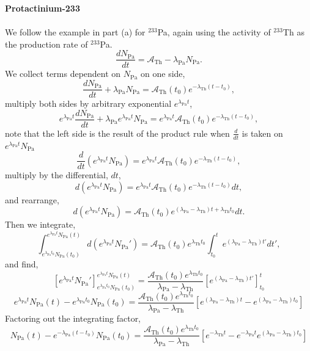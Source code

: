 \documentclass{report}
\begin{document}
\textbf{Protactinium-233}\\
\-\\
We follow the example in part (a) for $^{233}$Pa, again using the activity of $^{233}$Th as the production rate of $^{233}$Pa.
$$ \frac{dN_{\text{Pa}}}{dt} = \mathcal{A}_{\text{Th}} - \lambda_{\text{Pa}}N_{\text{Pa}}. $$
We collect terms dependent on $N_{\text{Pa}}$ on one side,
$$ \frac{dN_{\text{Pa}}}{dt} + \lambda_{\text{Pa}}N_{\text{Pa}} = \mathcal{A}_{\text{Th}}(t_0) e^{-\lambda_{\text{Th}}(t-t_0)}, $$
multiply both sides by arbitrary exponential $e^{\lambda_{\text{Pa}}t}$,
$$ e^{\lambda_{\text{Pa}}t}\frac{dN_{\text{Pa}}}{dt} + \lambda_{\text{Pa}}e^{\lambda_{\text{Pa}}t}N_{\text{Pa}} = e^{\lambda_{\text{Pa}}t}\mathcal{A}_{\text{Th}}(t_0) e^{-\lambda_{\text{Th}}(t-t_0)}, $$
note that the left side is the result of the product rule when $\frac{d}{dt}$ is taken on $e^{\lambda_{\text{Pa}}t}N_{\text{Pa}}$
$$ \frac{d}{dt} (e^{\lambda_{\text{Pa}}t}N_{\text{Pa}}) = e^{\lambda_{\text{Pa}}t}\mathcal{A}_{\text{Th}}(t_0) e^{-\lambda_{\text{Th}}(t-t_0)}, $$
multiply by the differential, $dt$,
$$ d(e^{\lambda_{\text{Pa}}t}N_{\text{Pa}}) = e^{\lambda_{\text{Pa}}t}\mathcal{A}_{\text{Th}}(t_0) e^{-\lambda_{\text{Th}}(t-t_0)} dt ,$$
and rearrange,
$$ d(e^{\lambda_{\text{Pa}}t}N_{\text{Pa}}) = \mathcal{A}_{\text{Th}}(t_0) e^{(\lambda_{\text{Pa}} - \lambda_{\text{Th}})t + \lambda_{\text{Th}}t_0} dt .$$
Then we integrate,
$$ \int_{e^{\lambda_{\text{Pa}}t_0}N_{\text{Pa}}(t_0)}^{e^{\lambda_{\text{Pa}}t}N_{\text{Pa}}(t)} d(e^{\lambda_{\text{Pa}}t}N_{\text{Pa}}') = \mathcal{A}_{\text{Th}}(t_0)e^{\lambda_{\text{Th}}t_0} \int_{t_0}^{t} e^{(\lambda_{\text{Pa}} - \lambda_{\text{Th}})t'} dt' ,$$
and find,
$$ \left[e^{\lambda_{\text{Pa}}t}N_{\text{Pa}}'\right]_{e^{\lambda_{\text{Pa}}t_0}N_{\text{Pa}}(t_0)}^{e^{\lambda_{\text{Pa}}t}N_{\text{Pa}}(t)} = \frac{\mathcal{A}_{\text{Th}}(t_0)e^{\lambda_{\text{Th}}t_0}}{\lambda_{\text{Pa}}-\lambda_{\text{Th}}} \left[ e^{(\lambda_{\text{Pa}}-\lambda_{\text{Th}})t'}\right]_{t_0}^{t} $$
$$ e^{\lambda_{\text{Pa}}t}N_{\text{Pa}}(t) - e^{\lambda_{\text{Pa}}t_0}N_{\text{Pa}}(t_0) = \frac{\mathcal{A}_{\text{Th}}(t_0)e^{\lambda_{\text{Th}}t_0}}{\lambda_{\text{Pa}}-\lambda_{\text{Th}}} \left[ e^{(\lambda_{\text{Pa}}-\lambda_{\text{Th}})t} - e^{(\lambda_{\text{Pa}}-\lambda_{\text{Th}})t_0} \right] $$
Factoring out the integrating factor, 
$$ N_{\text{Pa}}(t) - e^{-\lambda_{\text{Pa}}(t - t_0)}N_{\text{Pa}}(t_0) = \frac{\mathcal{A}_{\text{Th}}(t_0)e^{\lambda_{\text{Th}}t_0}}{\lambda_{\text{Pa}}-\lambda_{\text{Th}}} \left[ e^{-\lambda_{\text{Th}}t} - e^{-\lambda_{\text{Pa}}t}e^{(\lambda_{\text{Pa}}-\lambda_{\text{Th}})t_0} \right] $$
\end{document}
